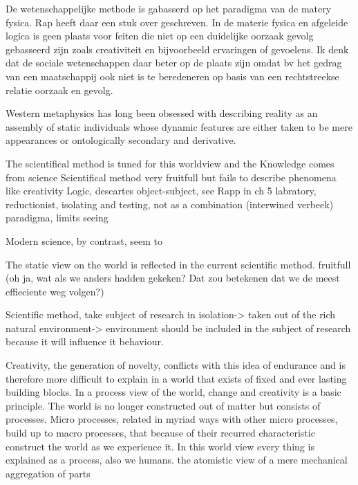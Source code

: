 De wetenschappelijke methode is gabasserd op het paradigma van de matery fysica.
Rap heeft daar een stuk over geschreven.
In de materie fysica en afgeleide logica is geen plaats voor feiten die niet op een duidelijke oorzaak gevolg gebasseerd zijn zoals creativiteit en bijvoorbeeld ervaringen of gevoelens.
Ik denk dat de sociale wetenschappen daar beter op de plaats zijn omdat bv het gedrag van een maatschappij ook niet is te beredeneren op basis van een rechtstreekse relatie oorzaak en gevolg.

Western metaphysics has long been obsessed with describing reality as an assembly of static individuals whose dynamic features are either taken to be mere appearances or ontologically secondary and derivative. 

The scientifical method is tuned for this worldview and the 
Knowledge comes from science
Scientifical method very fruitfull but fails to describe phenomena like creativity
Logic, descartes object-subject, see Rapp in ch 5
\cite[chapter 5]{rapp1990whitehad}
labratory, reductionist, isolating and testing, not as a combination (interwined verbeek)
paradigma, limits seeing
\cite[ch 5]{rapp1990whitehad}

Modern science, by contrast, seem to \cite[chapter 5]{rapp1990whitehad}


The static view on the world is reflected in the current scientific method.
fruitfull (oh ja, wat als we anders hadden gekeken? Dat zou betekenen dat we de meest effieciente weg volgen?)

Scientific method, take subject of research in isolation-> taken out of the rich natural environment-> environment should be included in the subject of research because it will influence it behaviour.

Creativity, the generation of novelty, conflicts with this idea of endurance and is therefore more difficult to explain in a world that exists of fixed and ever lasting building blocks.
In a process view of the world, change and creativity is a basic principle. The world is no longer constructed out of matter but consists of processes. Micro processes, related in myriad ways with other micro processes, build up to macro processes, that because of their recurred characteristic construct the world as we experience it. In this world view every thing is explained as a process, also we humans. 
\cite[ch 5]{rapp1990whitehead}
the atomistic view of a mere mechanical aggregation of parts

